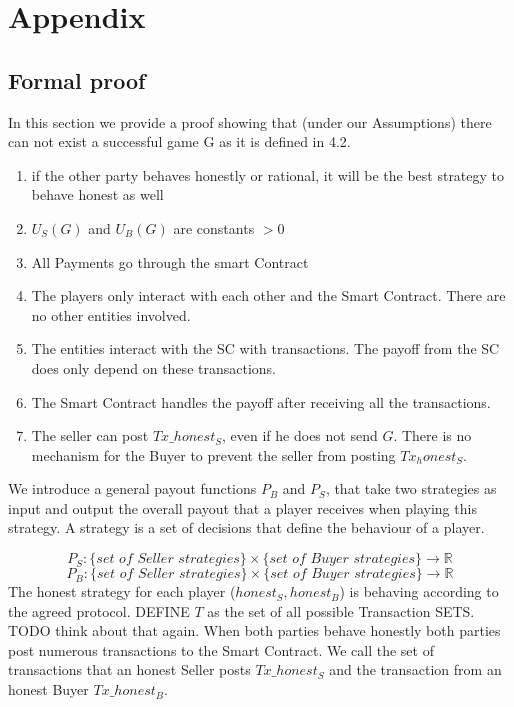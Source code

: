\documentclass{cacthesis}
\begin{document}
\chapter{Appendix}

\section{Formal proof}
In this section we provide a proof showing that (under our Assumptions) there can not exist  a successful game G as it is defined in 4.2.

\begin{enumerate}
    \item if the other party behaves honestly or rational, it will be the best strategy to behave honest as well
    \item $U_S(G)$ and $U_B(G)$ are constants $> 0$
    \item All Payments go through the smart Contract
    \item The players only interact with each other and the Smart Contract. There are no other entities involved.
    \item The entities interact with the SC with transactions. The payoff from the SC does only depend on these transactions.
    \item The Smart Contract handles the payoff after receiving all the transactions.
    \item The seller can post $Tx\_honest_S$, even if he does not send $G$. There is no mechanism for the Buyer to prevent the seller from posting $Tx_honest_S$.

\end{enumerate}


We introduce a general payout functions $P_B$ and $P_S$, that take two strategies as input and output the overall payout that a player receives when playing this strategy.\newline
A strategy is a set of decisions that define the behaviour of a player. %


\[P_S : \{ \textit{set of Seller strategies}\} \times \{ \textit{set of Buyer strategies}\} \to \mathbb{R}\]
\[P_B : \{ \textit{set of Seller strategies}\} \times \{ \textit{set of Buyer strategies}\} \to \mathbb{R}\]
The honest strategy for each player ($honest_S, honest_B$) is behaving according to the agreed protocol.
DEFINE $T$ as the set of all possible Transaction SETS. TODO think about that again.\newline
When both parties behave honestly both parties post numerous transactions to the Smart Contract. We call the set of transactions that an honest Seller posts $Tx\_honest_S$ and the transaction from an honest Buyer $Tx\_honest_B$.
\end{document}
